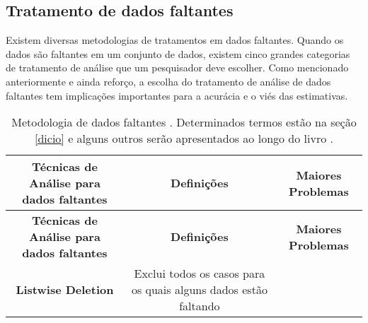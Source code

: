 \documentclass[
]{book}
\begin{document}
\hypertarget{tratamento-de-dados-faltantes}{%
\subsection{Tratamento de dados faltantes}\label{tratamento-de-dados-faltantes}}

Existem diversas metodologias de tratamentos em dados faltantes. Quando os dados são faltantes em um conjunto de dados, existem cinco grandes categorias de tratamento de análise que um pesquisador deve escolher. Como mencionado anteriormente e ainda reforço, a escolha do tratamento de análise de dados faltantes tem implicações importantes para a acurácia e o viés das estimativas.

\begin{longtable}[]{@{}ccc@{}}
\caption{\label{tab:preprocess} Metodologia de dados faltantes \citep{tecnicasinput}. Determinados termos estão na seção \ref{dicio} e alguns outros serão apresentados ao longo do livro .}\tabularnewline
\toprule
\begin{minipage}[b]{0.30\columnwidth}\centering
\textbf{Técnicas de Análise para dados faltantes}\strut
\end{minipage} & \begin{minipage}[b]{0.30\columnwidth}\centering
\textbf{Definições}\strut
\end{minipage} & \begin{minipage}[b]{0.30\columnwidth}\centering
\textbf{Maiores Problemas}\strut
\end{minipage}\tabularnewline
\midrule
\endfirsthead
\toprule
\begin{minipage}[b]{0.30\columnwidth}\centering
\textbf{Técnicas de Análise para dados faltantes}\strut
\end{minipage} & \begin{minipage}[b]{0.30\columnwidth}\centering
\textbf{Definições}\strut
\end{minipage} & \begin{minipage}[b]{0.30\columnwidth}\centering
\textbf{Maiores Problemas}\strut
\end{minipage}\tabularnewline
\midrule
\endhead
\begin{minipage}[t]{0.30\columnwidth}\centering
\textbf{Listwise Deletion}\strut
\end{minipage} & \begin{minipage}[t]{0.30\columnwidth}\centering
Exclui todos os casos para os quais alguns dados estão faltando\strut
\end{minipage} & \begin{minipage}[t]{0.30\columnwidth}\centering

\end{minipage}
\end{longtable}
\end{document}
